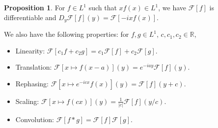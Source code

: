 \documentclass[]{article}
\theoremstyle{definition}
\newtheorem*{proposition}{Proposition}
\begin{document}
\begin{proposition}
  For \(f \in L^1\) such that \(xf(x) \in L^1\), we have \(\mathcal{F}[f]\) is 
  differentiable and \(D_y\mathcal{F}[f](y) = \mathcal{F}[-ixf(x)]\).
\end{proposition}

We also have the following properties: for \(f, g \in L^1\), \(c, c_1, c_2 \in \mathbb{R}\),
\begin{itemize}
  \item Linearity: \(\mathcal{F}[c_1 f + c_2 g] = c_1\mathcal{F}[f] + c_2 \mathcal{F}[g]\).
  \item Translation: \(\mathcal{F}[x \mapsto f(x - a)](y) = e^{-iay} \mathcal{F}[f](y)\).
  \item Rephasing: \(\mathcal{F}[x \mapsto e^{-icx}f(x)](y) = \mathcal{F}[f](y + c)\).
  \item Scaling: \(\mathcal{F}[x \mapsto f(cx)](y) = \frac{1}{|c|} \mathcal{F}[f](y / c)\).
  \item Convolution: \(\mathcal{F}[f * g] = \mathcal{F}[f] \mathcal{F}[g]\).
\end{itemize}
\end{document}
